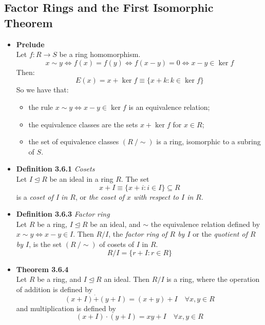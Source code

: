 \documentclass[11pt,a4paper]{article}
\begin{document}
\subsection{Factor Rings and the First Isomorphic Theorem}

\begin{itemize}

    \item \textbf{Prelude} \\
        Let $f : R \to S$ be a ring homomorphism.
        \[
            x \sim y \iff f(x) = f(y) \iff f(x-y) = 0 \iff x - y \in \ker f
        \]
        Then:
        \[
            E(x) = x + \ker f \equiv \{x + k : k \in \ker f \}
        \]
        So we have that:
        \begin{itemize}
            \item the rule $x \sim y \iff x - y \in \ker f$ is an equivalence relation;
            \item the equivalence classes are the sets $x + \ker f$ for $x \in R$;
            \item the set of equivalence classes $(R \ / \sim)$ is a ring,
                isomorphic to a subring of $S$.
        \end{itemize}

    \item \textbf{Definition 3.6.1} \emph{Cosets} \\
        Let $I \trianglelefteq R$ be an ideal in a ring $R$.
        The set
        \[
            x+I \equiv \{x + i : i \in I\} \subseteq R
        \]
        is a \emph{coset of I in $R$}, or
        \emph{the coset of $x$ with respect to $I$ in $R$}.

    \item \textbf{Definition 3.6.3} \emph{Factor ring} \\
        Let $R$ be a ring, $I \trianglelefteq R$ be an ideal, and $\sim$ the equivalence relation
        defined by
        $x \sim y \iff x-y \in I$.
        Then $R/I$, the \emph{factor ring of $R$ by $I$} or the \emph{quotient of $R$ by $I$},
        is the set $(R \ / \sim)$ of cosets of $I$ in $R$.
        \[
            R/I = \{r + I : r \in R \}
        \]

    \item \textbf{Theorem 3.6.4} \\
        Let $R$ be a ring, and $I \trianglelefteq R$ an ideal.
        Then $R/I$ is a ring, where the operation of addition is defined by
        \[
            (x+I) \dot{+} (y+I) = (x+y) + I \quad \forall x,y \in R
        \]
        and multiplication is defined by
        \[
            (x+I) \cdot (y+I) = x y + I \quad \forall x,y \in R
        \]


\end{itemize}
\end{document}
